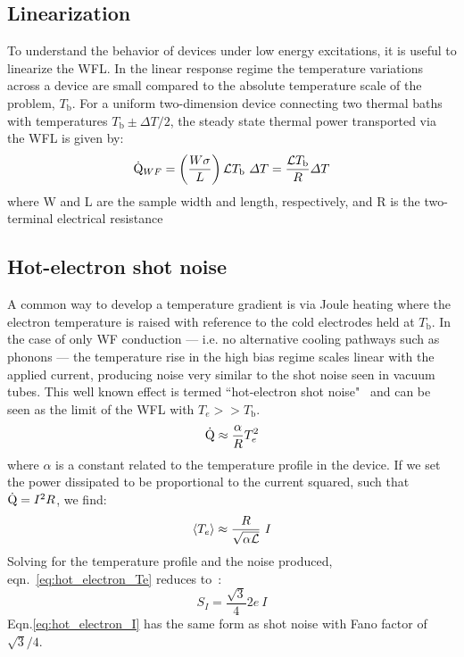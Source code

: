 \subsection{Linearization}
To understand the behavior of devices under low energy excitations, it is useful to linearize the WFL. In the linear response regime the temperature variations across a device are small compared to the absolute temperature scale of the problem, $T_\mathrm{b}$. For a uniform two-dimension device connecting two thermal baths with temperatures $T_\mathrm{b} \pm\Delta T/2$, the steady state thermal power transported via the WFL is given by:
\begin{equation}\label{eq:QWF}
\dot{\mathrm{Q}}_{WF} = \left(\frac{W\sigma}{L}\right)\mathcal{L} T_\mathrm{b}~\Delta T = \frac{\mathcal{L} T_\mathrm{b}}{R}\Delta T
\end{equation}
where W and L are the sample width and length, respectively, and R is the two-terminal electrical resistance
\subsection{Hot-electron shot noise}
A common way to develop a temperature gradient is via Joule heating where the electron temperature is raised with reference to the cold electrodes held at $T_\mathrm{b}$. In the case of only WF conduction --- i.e. no alternative cooling pathways such as phonons --- the temperature rise in the high bias regime scales linear with the applied current, producing noise very similar to the shot noise seen in vacuum tubes. This well known effect is termed ``hot-electron shot noise"~\cite{steinbach_observation_1996, blanter_shot_2000, de_jong_semiclassical_1996} and can be seen as the limit of the WFL with $T_e >> T_\mathrm{b}$.
\begin{equation}\label{eq:hot_electron_Q}
\dot{\mathrm{Q}} \approx \frac{\alpha\sl}{R}T_e^2
\end{equation}
where $\alpha$ is a constant related to the temperature profile in the device. If we set the power dissipated to be proportional to the current squared, such that $\dot{\mathrm{Q}} = I^2R$, we find:
\begin{equation}\label{eq:hot_electron_Te}
\langle T_e\rangle \approx \frac{R}{\sqrt{\alpha\mathcal{L}}}~I
\end{equation}
Solving for the temperature profile and the noise produced, eqn.~\ref{eq:hot_electron_Te} reduces to~\cite{steinbach_observation_1996}:
\begin{equation}\label{eq:hot_electron_I}
S_I = \frac{\sqrt{3}}{4}2e~I
\end{equation}
Eqn.\ref{eq:hot_electron_I} has the same form as shot noise with Fano factor of $\sqrt{3}/4$.

